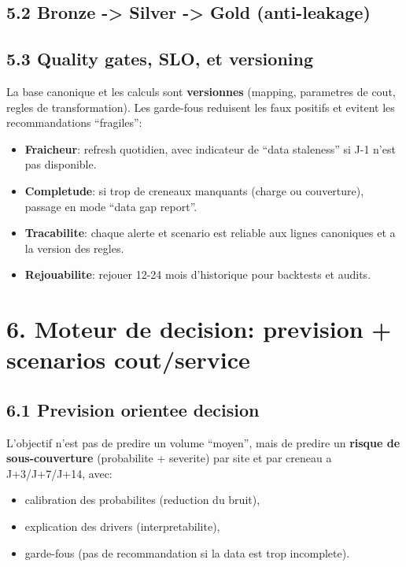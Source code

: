 \documentclass[11pt,a4paper]{article}
\begin{document}
\subsection*{5.2 Bronze -> Silver -> Gold (anti-leakage)}
\begin{center}
\end{center}

\subsection*{5.3 Quality gates, SLO, et versioning}
La base canonique et les calculs sont \textbf{versionnes} (mapping, parametres de cout, regles de transformation). Les garde-fous reduisent les faux positifs et evitent les recommandations ``fragiles'':
\begin{itemize}
  \item \textbf{Fraicheur}: refresh quotidien, avec indicateur de ``data staleness'' si J-1 n'est pas disponible.
  \item \textbf{Completude}: si trop de creneaux manquants (charge ou couverture), passage en mode ``data gap report''.
  \item \textbf{Tracabilite}: chaque alerte et scenario est reliable aux lignes canoniques et a la version des regles.
  \item \textbf{Rejouabilite}: rejouer 12-24 mois d'historique pour backtests et audits.
\end{itemize}

\section*{6. Moteur de decision: prevision + scenarios cout/service}
\subsection*{6.1 Prevision orientee decision}
L'objectif n'est pas de predire un volume ``moyen'', mais de predire un \textbf{risque de sous-couverture} (probabilite + severite) par site et par creneau a J+3/J+7/J+14, avec:
\begin{itemize}
  \item calibration des probabilites (reduction du bruit),
  \item explication des drivers (interpretabilite),
  \item garde-fous (pas de recommandation si la data est trop incomplete).
\end{itemize}
\end{document}
